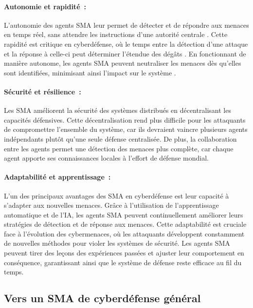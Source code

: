 \paragraph{Autonomie et rapidité :}
L'autonomie des agents SMA leur permet de détecter et de répondre aux menaces en temps réel, sans attendre les instructions d'une autorité centrale \cite{shamshirband2014cooperative}. Cette rapidité est critique en cyberdéfense, où le temps entre la détection d'une attaque et la réponse à celle-ci peut déterminer l'étendue des dégâts \cite{liao2013intrusion}. En fonctionnant de manière autonome, les agents SMA peuvent neutraliser les menaces dès qu'elles sont identifiées, minimisant ainsi l'impact sur le système \cite{shamshirband2018computational}.

\paragraph{Sécurité et résilience :}
Les SMA améliorent la sécurité des systèmes distribués en décentralisant les capacités défensives. Cette décentralisation rend plus difficile pour les attaquants de compromettre l'ensemble du système, car ils devraient vaincre plusieurs agents indépendants plutôt qu'une seule défense centralisée. De plus, la collaboration entre les agents permet une détection des menaces plus complète, car chaque agent apporte ses connaissances locales à l'effort de défense mondial.

\paragraph{Adaptabilité et apprentissage :}
L'un des principaux avantages des SMA en cyberdéfense est leur capacité à s'adapter aux nouvelles menaces. Grâce à l'utilisation de l'apprentissage automatique et de l'IA, les agents SMA peuvent continuellement améliorer leurs stratégies de détection et de réponse aux menaces. Cette adaptabilité est cruciale face à l'évolution des cybermenaces, où les attaquants développent constamment de nouvelles méthodes pour violer les systèmes de sécurité. Les agents SMA peuvent tirer des leçons des expériences passées et ajuster leur comportement en conséquence, garantissant ainsi que le système de défense reste efficace au fil du temps.

\subsection{Vers un SMA de cyberdéfense général}

